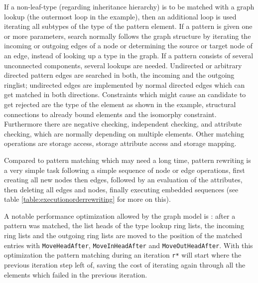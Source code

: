 If a non-leaf-type (regarding inheritance hierarchy) is to be matched with a graph lookup (the outermost loop in the example), then an additional loop is used iterating all subtypes of the type of the pattern element.
If a pattern is given one or more parameters, search normally follows the graph structure by iterating the incoming or outgoing edges of a node or determining the source or target node of an edge, instead of looking up a type in the graph.
If a pattern consists of several unconnected components, several lookups are needed.
Undirected or arbitrary directed pattern edges are searched in both, the incoming and the outgoing ringlist; undirected edges are implemented by normal directed edges which can get matched in both directions.
Constraints which might cause an candidate to get rejected are the type of the element as shown in the example, structural connections to already bound elements and the isomorphy constraint.
Furthermore there are negative checking, independent checking, and attribute checking, which are normally depending on multiple elements.
Other matching operations are storage access, storage attribute access and storage mapping.

Compared to pattern matching which may need a long time, pattern rewriting is a very simple task following a simple sequence of node or edge operations, first creating all new nodes then edges, followed by an evaluation of the attributes, then deleting all edges and nodes, finally executing embedded sequences (see table \ref{table:executionorderrewriting} for more on this).

A notable performance optimization allowed by the graph model is : 
after a pattern was matched, the list heads of the type lookup ring lists, the incoming ring lists and the outgoing  ring lists are moved to the position of the matched entries with \texttt{MoveHeadAfter}, \texttt{MoveInHeadAfter} and \texttt{MoveOutHeadAfter}.
With this optimization the pattern matching during an iteration \texttt{r*} will start where the previous iteration step left of, saving the cost of iterating again through all the elements which failed in the previous iteration.

\vspace{1cm} %

